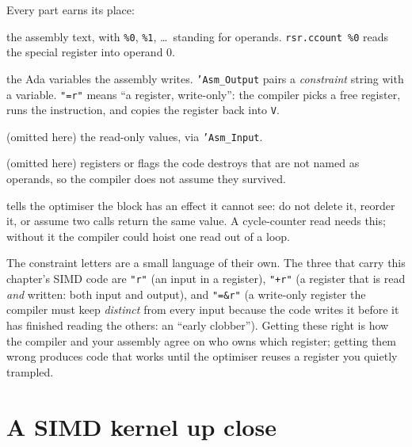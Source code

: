 Every part earns its place:

\begin{description}[style=nextline]
\item[Template] the assembly text, with \texttt{\%0}, \texttt{\%1}, \ldots\ standing
  for operands. \texttt{rsr.ccount \%0} reads the special register into operand 0.
\item[Outputs] the Ada variables the assembly writes. \texttt{'Asm\_Output} pairs a
  \emph{constraint} string with a variable. \texttt{"=r"} means ``a register,
  write-only'': the compiler picks a free register, runs the instruction, and copies
  the register back into \texttt{V}.
\item[Inputs] (omitted here) the read-only values, via \texttt{'Asm\_Input}.
\item[Clobber] (omitted here) registers or flags the code destroys that are not
  named as operands, so the compiler does not assume they survived.
\item[Volatile] tells the optimiser the block has an effect it cannot see: do not
  delete it, reorder it, or assume two calls return the same value. A cycle-counter
  read needs this; without it the compiler could hoist one read out of a loop.
\end{description}

The constraint letters are a small language of their own. The three that carry this
chapter's SIMD code are \texttt{"r"} (an input in a register), \texttt{"+r"} (a
register that is read \emph{and} written: both input and output), and
\texttt{"=\&r"} (a write-only register the compiler must keep \emph{distinct} from
every input because the code writes it before it has finished reading the others:
an ``early clobber''). Getting these right is how the compiler and your assembly
agree on who owns which register; getting them wrong produces code that works until
the optimiser reuses a register you quietly trampled.


\section{A SIMD kernel up close}

